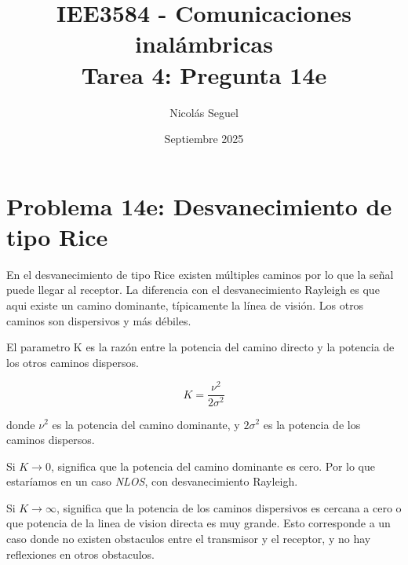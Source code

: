 \documentclass[11pt]{article}
\title{IEE3584 - Comunicaciones inalámbricas \\
Tarea 4: Pregunta 14e}
\author{Nicolás Seguel}
\date{Septiembre 2025}
\begin{document}
\maketitle

\section*{Problema 14e: Desvanecimiento de tipo Rice}

En el desvanecimiento de tipo Rice existen múltiples caminos por lo que la señal puede llegar al receptor. La diferencia con el desvanecimiento Rayleigh es que aqui existe un camino dominante, típicamente la línea de visión. Los otros caminos son dispersivos y más débiles.

El parametro K es la razón entre la potencia del camino directo y la potencia de los otros caminos dispersos.

\[
K = \frac{\nu^2}{2\sigma^2}
\]

donde \(\nu^2\) es la potencia del camino dominante, y \(2\sigma^2\) es la potencia de los caminos dispersos.

Si \(K \rightarrow  0\), significa que la potencia del camino dominante es cero. Por lo que estaríamos en un caso \textit{NLOS}, con desvanecimiento Rayleigh.

Si \(K \rightarrow \infty\), significa que la potencia de los caminos dispersivos es cercana a cero o que potencia de la linea de vision directa es muy grande. Esto corresponde a un caso donde no existen obstaculos entre el transmisor y el receptor, y no hay reflexiones en otros obstaculos. 
\end{document}
